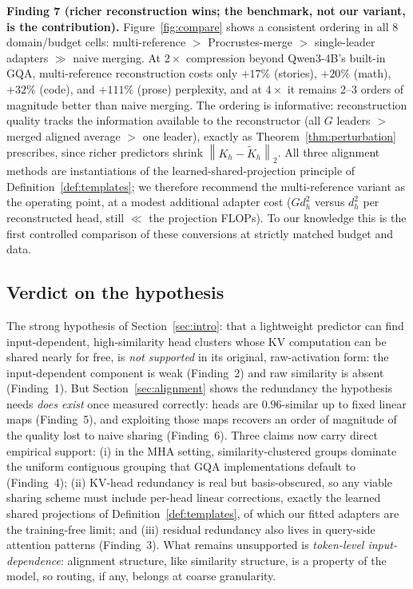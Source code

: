 \documentclass{article}
\newcommand{\opnorm}[1]{\left\lVert #1 \right\rVert_{2}}
\begin{document}
\textbf{Finding 7 (richer reconstruction wins; the benchmark, not our
variant, is the contribution).} Figure~\ref{fig:compare} shows a consistent
ordering in all 8 domain/budget cells:
multi-reference $>$ Procrustes-merge $>$ single-leader adapters $\gg$ naive
merging. At $2\times$ compression beyond Qwen3-4B's built-in GQA,
multi-reference reconstruction costs only $+17\%$ (stories), $+20\%$
(math), $+32\%$ (code), and $+111\%$ (prose) perplexity, and at $4\times$
it remains 2--3 orders of magnitude better than naive merging. The ordering
is informative: reconstruction quality tracks the information available to
the reconstructor (all $G$ leaders $>$ merged aligned average $>$ one
leader), exactly as Theorem~\ref{thm:perturbation} prescribes, since richer
predictors shrink $\opnorm{K_h - \tilde K_h}$. All three alignment methods
are instantiations of the learned-shared-projection principle of
Definition~\ref{def:templates}; we therefore recommend the multi-reference
variant as the operating point, at a modest additional adapter cost
($G d_h^2$ versus $d_h^2$ per reconstructed head, still $\ll$ the
projection FLOPs). To our knowledge this is the first controlled comparison
of these conversions at strictly matched budget and data.

\subsection{Verdict on the hypothesis}
\label{sec:verdict}

The strong hypothesis of Section~\ref{sec:intro}: that a lightweight
predictor can find input-dependent, high-similarity head clusters whose KV
computation can be shared nearly for free, is \emph{not supported} in its
original, raw-activation form: the input-dependent component is weak
(Finding~2) and raw similarity is absent (Finding~1). But
Section~\ref{sec:alignment} shows the redundancy the hypothesis needs
\emph{does exist} once measured correctly: heads are $0.96$-similar up to
fixed linear maps (Finding~5), and exploiting those maps recovers an
order of magnitude of the quality lost to naive sharing (Finding~6). Three
claims now carry direct empirical support: (i) in the MHA setting,
similarity-clustered groups dominate the uniform contiguous grouping that
GQA implementations default to (Finding~4); (ii) KV-head redundancy is
real but basis-obscured, so any viable sharing scheme must include
per-head linear corrections, exactly the learned shared projections of
Definition~\ref{def:templates}, of which our fitted adapters are the
training-free limit; and (iii) residual redundancy also lives in
query-side attention patterns (Finding~3). What remains unsupported is
\emph{token-level input-dependence}: alignment structure, like similarity
structure, is a property of the model, so routing, if any, belongs at
coarse granularity.
\end{document}

